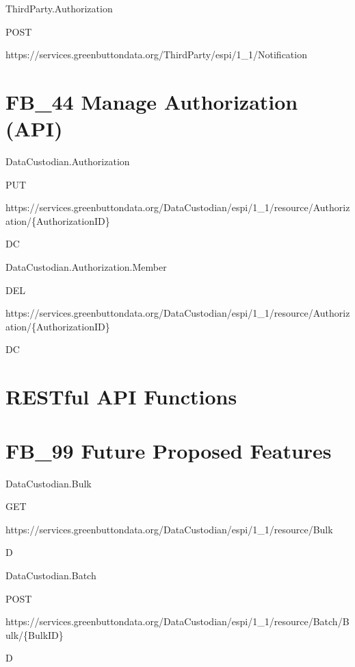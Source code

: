 \documentclass[a4paper,12pt,single,pdftex]{scrbook}
\begin{document}
ThirdParty.Authorization

POST

https://services.greenbuttondata.org/ThirdParty/espi/1\_1/Notification\chapter{FB\_44 Manage Authorization (API)}


DataCustodian.Authorization

PUT

https://services.greenbuttondata.org/DataCustodian/espi/1\_1/resource/Authorization/\{AuthorizationID\}

DC

DataCustodian.Authorization.Member

DEL

https://services.greenbuttondata.org/DataCustodian/espi/1\_1/resource/Authorization/\{AuthorizationID\}

DC\chapter{RESTful API Functions}
\chapter{FB\_99 Future Proposed Features}


DataCustodian.Bulk

GET

https://services.greenbuttondata.org/DataCustodian/espi/1\_1/resource/Bulk

D

DataCustodian.Batch

POST

https://services.greenbuttondata.org/DataCustodian/espi/1\_1/resource/Batch/Bulk/\{BulkID\}

D
\end{document}
